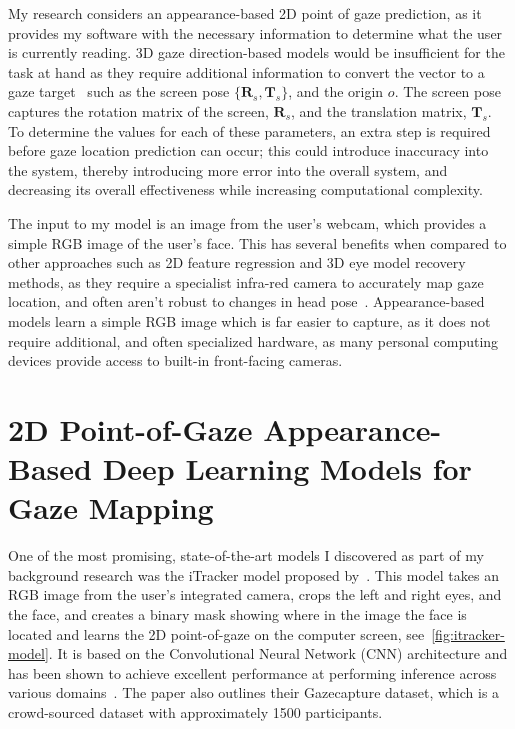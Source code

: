 \documentclass{report}
\begin{document}
My research considers an appearance-based 2D point of gaze prediction, as it provides my software with the necessary information to determine what the user is currently reading. 3D gaze direction-based models would be insufficient for the task at hand as they require additional information to convert the vector to a gaze target~\cite{cheng2021survey} such as the screen pose \(\{\pmb R_s, \pmb T_s\}\), and the origin \(o\). The screen pose captures the rotation matrix of the screen, \(\pmb R_s\), and the translation matrix, \(\pmb T_s\). To determine the values for each of these parameters, an extra step is required before gaze location prediction can occur; this could introduce inaccuracy into the system, thereby introducing more error into the overall system, and decreasing its overall effectiveness while increasing computational complexity. 

The input to my model is an image from the user's webcam, which provides a simple RGB image of the user's face. This has several benefits when compared to other approaches such as 2D feature regression and 3D eye model recovery methods, as they require a specialist infra-red camera to accurately map gaze location, and often aren't robust to changes in head pose~\cite{zhu2006nonlinear}. Appearance-based models learn a simple RGB image which is far easier to capture, as it does not require additional, and often specialized hardware, as many personal computing devices provide access to built-in front-facing cameras. 

\section{2D Point-of-Gaze Appearance-Based Deep Learning Models for Gaze Mapping}


One of the most promising, state-of-the-art models I discovered as part of my background research was the iTracker model proposed by~\textcite{krafka2016eye}. This model takes an RGB image from the user's integrated camera, crops the left and right eyes, and the face, and creates a binary mask showing where in the image the face is located and learns the 2D point-of-gaze on the computer screen, see~\autoref{fig:itracker-model}. It is based on the Convolutional Neural Network (CNN) architecture and has been shown to achieve excellent performance at performing inference across various domains~\cite{cheng2021survey}. The paper also outlines their Gazecapture dataset, which is a crowd-sourced dataset with approximately 1500 participants. 
\end{document}
